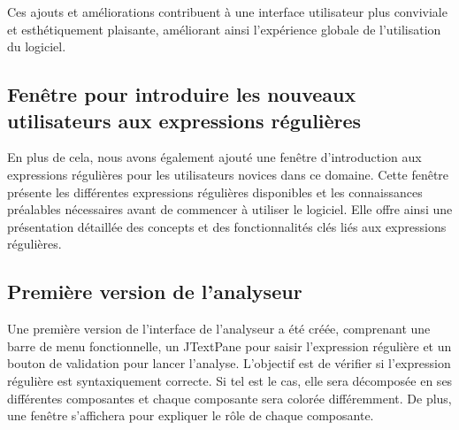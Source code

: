 \documentclass{article}
\begin{document}
Ces ajouts et améliorations contribuent à une interface utilisateur plus conviviale et esthétiquement plaisante, améliorant ainsi l'expérience globale de l'utilisation du logiciel.

\subsection{Fenêtre pour introduire les nouveaux utilisateurs aux expressions régulières}

En plus de cela, nous avons également ajouté une fenêtre d'introduction aux expressions régulières pour les utilisateurs novices dans ce domaine. Cette fenêtre présente les différentes expressions régulières disponibles et les connaissances préalables nécessaires avant de commencer à utiliser le logiciel. Elle offre ainsi une présentation détaillée des concepts et des fonctionnalités clés liés aux expressions régulières.

\subsection{Première version de l'analyseur}

Une première version de l'interface de l'analyseur a été créée, comprenant une barre de menu fonctionnelle, un JTextPane pour saisir l'expression régulière et un bouton de validation pour lancer l'analyse. L'objectif est de vérifier si l'expression régulière est syntaxiquement correcte. Si tel est le cas, elle sera décomposée en ses différentes composantes et chaque composante sera colorée différemment. De plus, une fenêtre s'affichera pour expliquer le rôle de chaque composante.
\end{document}
